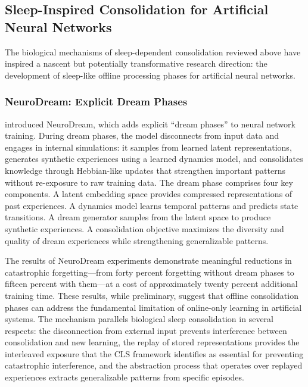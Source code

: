 \subsection{Sleep-Inspired Consolidation for Artificial Neural Networks}

The biological mechanisms of sleep-dependent consolidation reviewed above have inspired a nascent but potentially transformative research direction: the development of sleep-like offline processing phases for artificial neural networks.

\subsubsection{NeuroDream: Explicit Dream Phases}

\citet{tutuncuoglu2024neurodream} introduced NeuroDream, which adds explicit ``dream phases'' to neural network training. During dream phases, the model disconnects from input data and engages in internal simulations: it samples from learned latent representations, generates synthetic experiences using a learned dynamics model, and consolidates knowledge through Hebbian-like updates that strengthen important patterns without re-exposure to raw training data. The dream phase comprises four key components. A latent embedding space provides compressed representations of past experiences. A dynamics model learns temporal patterns and predicts state transitions. A dream generator samples from the latent space to produce synthetic experiences. A consolidation objective maximizes the diversity and quality of dream experiences while strengthening generalizable patterns.

The results of NeuroDream experiments demonstrate meaningful reductions in catastrophic forgetting---from forty percent forgetting without dream phases to fifteen percent with them---at a cost of approximately twenty percent additional training time. These results, while preliminary, suggest that offline consolidation phases can address the fundamental limitation of online-only learning in artificial systems. The mechanism parallels biological sleep consolidation in several respects: the disconnection from external input prevents interference between consolidation and new learning, the replay of stored representations provides the interleaved exposure that the CLS framework identifies as essential for preventing catastrophic interference, and the abstraction process that operates over replayed experiences extracts generalizable patterns from specific episodes.

